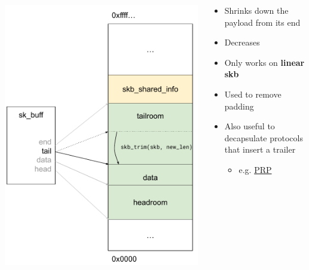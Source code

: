 \begin{frame}{}
	\begin{columns}
		\begin{column}{0.4\textwidth}
			\includegraphics[width=\textwidth]{slides/networking-skb/skb_trim.pdf}
		\end{column}
		\begin{column}{0.6\textwidth}
			\begin{itemize}
				\item Shrinks down the payload from its end
				\item Decreases 
				\item Only works on \textbf{linear skb}
				\item Used to remove padding
				\item Also useful to decapsulate protocols that insert a trailer
					\begin{itemize}
						\item e.g. \href{https://elixir.bootlin.com/linux/v6.15.1/source/net/hsr/hsr_forward.c\#L196}{PRP}
					\end{itemize}
			\end{itemize}
		\end{column}
	\end{columns}

\end{frame}

